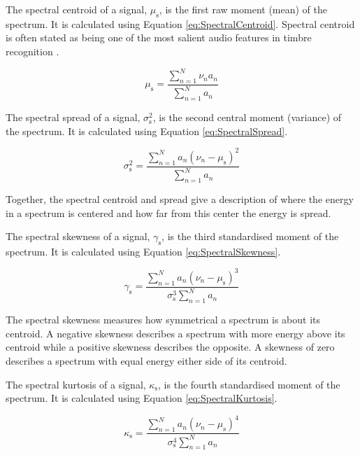 			The spectral centroid of a signal, $\mu_{\textrm{s}}$, is the first raw moment (mean) of the
			spectrum. It is calculated using Equation \ref{eq:SpectralCentroid}. Spectral centroid is often
			stated as being one of the most salient audio features in timbre recognition
			\citep{freed1990auditory, lakatos2000a}. 

			\begin{equation}
				\mu_{\textrm{s}} = \frac{\sum_{n = 1}^{N} \nu_{n}a_{n}}
					   	   {\sum_{n = 1}^{N} a_{n}}
				\label{eq:SpectralCentroid}
			\end{equation}

			The spectral spread of a signal, $\sigma_{\textrm{s}}^{2}$, is the second central moment (variance)
			of the spectrum. It is calculated using Equation \ref{eq:SpectralSpread}.

			\begin{equation}
				\sigma_{\textrm{s}}^{2} = \frac{\sum_{n = 1}^{N} a_{n}(\nu_{n} - \mu_{\textrm{s}})^{2}}
						  	  {\sum_{n = 1}^{N} a_{n}}
				\label{eq:SpectralSpread}
			\end{equation}

			Together, the spectral centroid and spread give a description of where the energy in a spectrum is
			centered and how far from this center the energy is spread.

			The spectral skewness of a signal, $\gamma_{\textrm{s}}$, is the third standardised moment of the
			spectrum. It is calculated using Equation \ref{eq:SpectralSkewness}.

			\begin{equation}
				\gamma_{\textrm{s}} = \frac{\sum_{n = 1}^{N} a_{n}(\nu_{n} - \mu_{\textrm{s}})^{3}}
					{\sigma_{\textrm{s}}^{3}\sum_{n = 1}^{N} a_{n}}
				\label{eq:SpectralSkewness}
			\end{equation}

			The spectral skewness measures how symmetrical a spectrum is about its centroid. A negative skewness
			describes a spectrum with more energy above its centroid while a positive skewness describes the
			opposite. A skewness of zero describes a spectrum with equal energy either side of its centroid.

			The spectral kurtosis of a signal, $\kappa_{\textrm{s}}$, is the fourth standardised moment of the
			spectrum. It is calculated using Equation \ref{eq:SpectralKurtosis}.

			\begin{equation}
				\kappa_{\textrm{s}} = \frac{\sum_{n = 1}^{N} a_{n}(\nu_{n} - \mu_{\textrm{s}})^{4}}
					{\sigma_{\textrm{s}}^{4}\sum_{n = 1}^{N} a_{n}}
				\label{eq:SpectralKurtosis}
			\end{equation}

